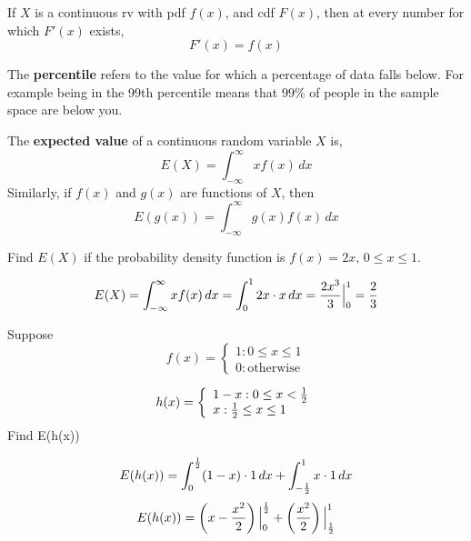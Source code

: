 \documentclass[english, 12pt]{article}
\begin{document}
\begin{note}
If $X$ is a continuous rv with pdf $f(x)$, and cdf $F(x)$, then at every number for which $F'(x)$ exists,
\[F'(x) = f(x)\]
\end{note}

\begin{defn}
The \textbf{percentile} refers to the value for which a percentage of data falls below. For example being in the 99th percentile means that $99\%$ of people in the sample space are below you.
\end{defn}


\begin{defn}
The \textbf{expected value} of a continuous random variable $X$ is,
\[E(X) = \int_{-\infty}^\infty x f(x)\,dx\]
Similarly, if $f(x)$ and $g(x)$ are functions of $X$, then
\[E(g(x)) = \int_{-\infty}^\infty g(x) f(x)\,dx\]
\end{defn}

\begin{exmp}
Find $E(X)$ if the probability density function is $f(x) = 2x,\, 0 \leq x \leq 1$.

\begin{sol}
\[E(X) = \int_{-\infty}^\infty x f(x)\,dx = \int_0^1 2x \cdot x\,dx = \frac{2x^3}{3}\Big|_0^1 = \frac{2}{3}\]
\end{sol}
\end{exmp}

\begin{exmp}
Suppose
\begin{displaymath}
   f(x) = \left\{
     \begin{array}{lr}
       1 : 0 \leq x \leq 1 \\
       0 : \text{otherwise}
     \end{array}
   \right.
\end{displaymath}

\begin{displaymath}
   h(x) = \left\{
     \begin{array}{lr}
       1-x : 0 \leq x < \frac{1}{2} \\
       x : \frac{1}{2} \leq x \leq 1
     \end{array}
   \right.
\end{displaymath}
Find E(h(x))

\begin{sol}
\[E(h(x)) = \int_0^{\frac{1}{2}} (1-x)\cdot 1\,dx + \int_{-\frac{1}{2}}^1 x \cdot 1\,dx\]
\[E(h(x)) = \left(x - \frac{x^2}{2}\right)\Big|_0^{\frac{1}{2}} + \left(\frac{x^2}{2}\right)\Big|_{\frac{1}{2}}^1\]
\end{sol}
\end{exmp}
\end{document}
